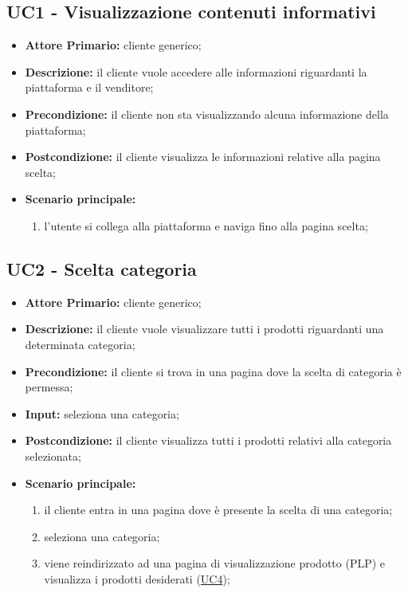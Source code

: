 \subsection{UC1 - Visualizzazione contenuti informativi}
\label{UC1}
\begin{itemize}
    \item \textbf{Attore Primario:} cliente generico;
    \item \textbf{Descrizione:} il cliente vuole accedere alle informazioni riguardanti la piattaforma e il venditore;
    \item \textbf{Precondizione:} il cliente non sta visualizzando alcuna informazione della piattaforma;
    \item \textbf{Postcondizione:} il cliente visualizza le informazioni relative alla pagina scelta;
    \item \textbf{Scenario principale:}
    \begin{enumerate}
        \item l'utente si collega alla piattaforma e naviga fino alla pagina scelta;
    \end{enumerate}
\end{itemize}

\subsection{UC2 - Scelta categoria}
\label{UC2}
\begin{itemize}
    \item \textbf{Attore Primario:} cliente generico;
    \item \textbf{Descrizione:} il cliente vuole visualizzare tutti i prodotti riguardanti una determinata categoria;
    \item \textbf{Precondizione:} il cliente si trova in una pagina dove la scelta di categoria è permessa;
    \item \textbf{Input:} seleziona una categoria;
    \item \textbf{Postcondizione:} il cliente visualizza tutti i prodotti relativi alla categoria selezionata;
    \item \textbf{Scenario principale:}
    \begin{enumerate}
        \item il cliente entra in una pagina dove è presente la scelta di una categoria;
        \item seleziona una categoria;
        \item viene reindirizzato ad una pagina di visualizzazione prodotto (PLP) e visualizza i prodotti desiderati (\hyperref[UC4]{UC4});
    \end{enumerate}
\end{itemize}

